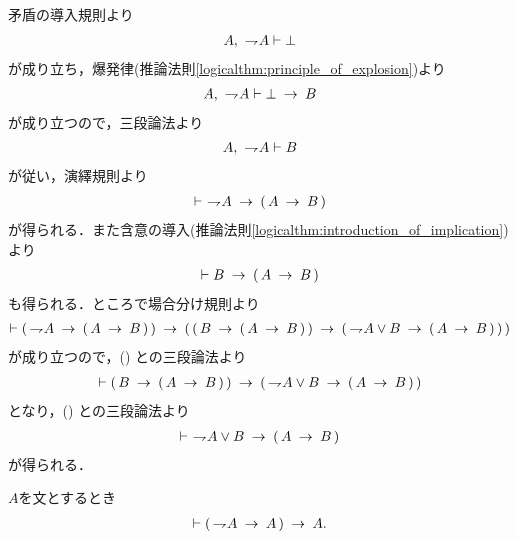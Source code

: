 	\begin{prf}
		矛盾の導入規則より
		\begin{align}
			A,\ \negation A \vdash \bot
		\end{align}
		が成り立ち，爆発律(推論法則\ref{logicalthm:principle_of_explosion})より
		\begin{align}
			A,\ \negation A \vdash \bot \rarrow B
		\end{align}
		が成り立つので，三段論法より
		\begin{align}
			A,\ \negation A \vdash B
		\end{align}
		が従い，演繹規則より
		\begin{align}
			\vdash\ \negation A \rarrow (\, A \rarrow B\, )
			\label{fom:disjunction_of_negation_rewritable_by_implication_1}
		\end{align}
		が得られる．また含意の導入(推論法則\ref{logicalthm:introduction_of_implication})より
		\begin{align}
			\vdash B \rarrow (\, A \rarrow B\, )
			\label{fom:disjunction_of_negation_rewritable_by_implication_2}
		\end{align}
		も得られる．ところで場合分け規則より
		\begin{align}
			\vdash (\, \negation A \rarrow (\, A \rarrow B\, )\, )
			\rarrow (\, (\, B \rarrow (\, A \rarrow B\, )\, )
			\rarrow (\, \negation A \vee B \rarrow (\, A \rarrow B\, )\, )\, )
		\end{align}
		が成り立つので，()
		との三段論法より
		\begin{align}
			\vdash (\, B \rarrow (\, A \rarrow B\, )\, )
			\rarrow (\, \negation A \vee B \rarrow (\, A \rarrow B\, )\, )
		\end{align}
		となり，()
		との三段論法より
		\begin{align}
			\vdash\ \negation A \vee B \rarrow (\, A \rarrow B\, )
		\end{align}
		が得られる．
		\QED
	\end{prf}
	
	\begin{screen}
		\begin{thm}[驚嘆すべき帰結]\label{logicalthm:consequentia_mirabilis}
			$A$を文とするとき
			\begin{align}
				\vdash (\, \negation A \rarrow A\, ) \rarrow A.
			\end{align}
		\end{thm}
	\end{screen}
	
